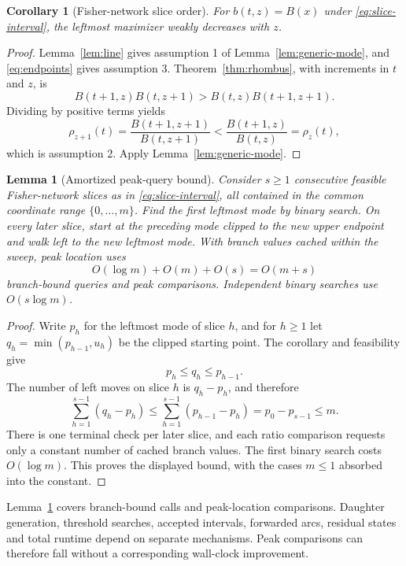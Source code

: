 \documentclass[10pt]{article}
\newtheorem{lemma}{Lemma}
\newtheorem{corollary}{Corollary}
\begin{document}
\begin{corollary}[Fisher-network slice order]
\label{cor:fisher-mode}
For \(b(t,z)=B(x)\) under \eqref{eq:slice-interval}, the leftmost
maximizer weakly decreases with \(z\).
\end{corollary}

\begin{proof}
Lemma~\ref{lem:line} gives assumption 1 of
Lemma~\ref{lem:generic-mode}, and \eqref{eq:endpoints} gives assumption
3.  Theorem~\ref{thm:rhombus}, with increments in \(t\) and \(z\), is
\[
 B(t+1,z)B(t,z+1)>B(t,z)B(t+1,z+1).
\]
Dividing by positive terms yields
\[
 \rho_{z+1}(t)=\frac{B(t+1,z+1)}{B(t,z+1)}
 <\frac{B(t+1,z)}{B(t,z)}=\rho_z(t),
\]
which is assumption 2.  Apply Lemma~\ref{lem:generic-mode}.
\end{proof}

\begin{lemma}[Amortized peak-query bound]
\label{lem:query-bound}
Consider \(s\ge 1\) consecutive feasible Fisher-network slices as
in \eqref{eq:slice-interval}, all contained in the common coordinate
range \(\{0,\ldots,m\}\). Find the first leftmost mode by binary search.  On every later slice,
start at the preceding mode clipped to the new upper endpoint and walk
left to the new leftmost mode.  With branch values cached within the
sweep, peak location uses
\[
 O(\log m)+O(m)+O(s)=O(m+s)
\]
branch-bound queries and peak comparisons.  Independent binary searches
use \(O(s\log m)\).
\end{lemma}

\begin{proof}
Write \(p_h\) for the leftmost mode of slice \(h\), and for \(h\ge1\)
let \(q_h=\min(p_{h-1},u_h)\) be the clipped starting point.  The
corollary and feasibility give
\[
 p_h\le q_h\le p_{h-1}.
\]
The number of left moves on slice \(h\) is \(q_h-p_h\), and therefore
\[
 \sum_{h=1}^{s-1}(q_h-p_h)
 \le \sum_{h=1}^{s-1}(p_{h-1}-p_h)
 =p_0-p_{s-1}\le m.
\]
There is one terminal check per later slice, and each ratio comparison
requests only a constant number of cached branch values.  The first
binary search costs \(O(\log m)\).  This proves the displayed bound,
with the cases \(m\le1\) absorbed into the constant.
\end{proof}

Lemma~\ref{lem:query-bound} covers branch-bound calls and peak-location
comparisons.  Daughter generation, threshold searches, accepted intervals,
forwarded arcs, residual states and total runtime depend on separate
mechanisms.  Peak comparisons can therefore fall without a corresponding
wall-clock improvement.
\end{document}
